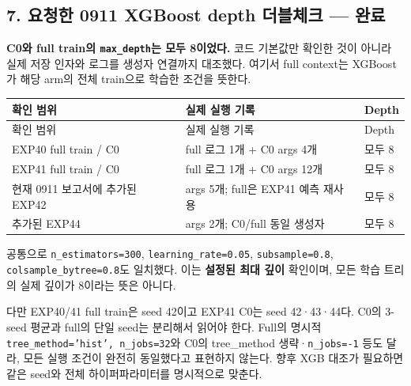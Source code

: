 \subsection{7. 요청한 0911 XGBoost depth 더블체크 — 완료}
\textbf{C0와 full train의 \texttt{max\_\allowbreak{}\allowbreak{}dept\allowbreak{}h}는 모두 8이었다.} 코드 기본값만 확인한 것이 아니라 실제 저장 인자와 로그를 생성자 연결까지 대조했다. 여기서 full context는 XGBoost가 해당 arm의 전체 train으로 학습한 조건을 뜻한다.

\begingroup
\footnotesize
\begin{longtable}{>{\raggedright\arraybackslash}p{}>{\raggedright\arraybackslash}p{}>{\raggedright\arraybackslash}p{}}
\toprule
확인 범위 & 실제 실행 기록 & Depth \\ \midrule
\endfirsthead
확인 범위 & 실제 실행 기록 & Depth \\ \midrule
\endhead
{}EXP40 full train /\allowbreak{} C0 & full 로그 1개 +\allowbreak{} C0 args 4개 & 모두 8 \\
{}EXP41 full train /\allowbreak{} C0 & full 로그 1개 +\allowbreak{} C0 args 12개 & 모두 8 \\
{}현재 0911 보고서에 추가된 EXP42 & args 5개; full은 EXP41 예측 재사용 & 모두 8 \\
{}추가된 EXP44 & args 2개; C0/\allowbreak{}full 동일 생성자 & 모두 8 \\
\bottomrule
\end{longtable}
\endgroup
공통으로 \texttt{n\_\allowbreak{}\allowbreak{}estima\allowbreak{}tors=\allowbreak{}\allowbreak{}300\allowbreak{}}, \texttt{learning\allowbreak{}\_\allowbreak{}\allowbreak{}rate=\allowbreak{}\allowbreak{}0.\allowbreak{}05}, \texttt{subsampl\allowbreak{}e=\allowbreak{}\allowbreak{}0.\allowbreak{}8}, \texttt{colsampl\allowbreak{}e\_\allowbreak{}\allowbreak{}bytree\allowbreak{}=\allowbreak{}\allowbreak{}0.\allowbreak{}8}도 일치했다. 이는 \textbf{설정된 최대 깊이} 확인이며, 모든 학습 트리의 실제 깊이가 8이라는 뜻은 아니다.

다만 EXP40/\allowbreak{}41 full train은 seed 42이고 EXP41 C0는 seed 42·43·44다. C0의 3-seed 평균과 full의 단일 seed는 분리해서 읽어야 한다. Full의 명시적 \texttt{tree\_\allowbreak{}\allowbreak{}met\allowbreak{}hod=\allowbreak{}\allowbreak{}'his\allowbreak{}t',\allowbreak{} n\_\allowbreak{}\allowbreak{}jo\allowbreak{}bs=\allowbreak{}\allowbreak{}32}와 C0의 tree\_\allowbreak{}method 생략·\texttt{n\_\allowbreak{}\allowbreak{}jobs=\allowbreak{}\allowbreak{}-\allowbreak{}1} 등도 달라, 모든 실행 조건이 완전히 동일했다고 표현하지 않는다. 향후 XGB 대조가 필요하면 같은 seed와 전체 하이퍼파라미터를 명시적으로 맞춘다.

